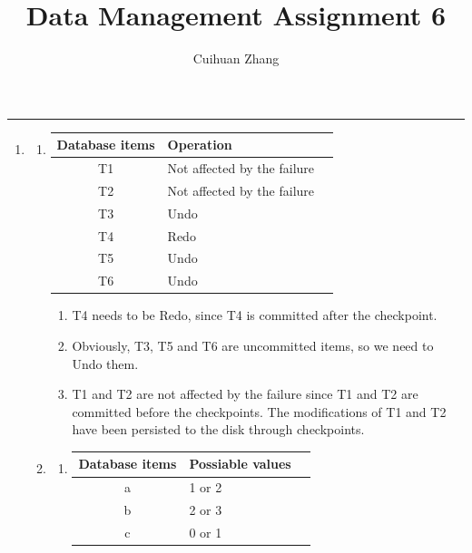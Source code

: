 \documentclass[12pt]{extarticle}
\title{Data Management Assignment 6}
\author{Cuihuan Zhang}
\begin{document}
\maketitle \vspace{-10mm}
\rule{\linewidth}{0.4pt}

\begin{flushleft}
\begin{enumerate}

\item

\begin{enumerate}

\item \begin{tabular}{cll}
\toprule
\textbf{Database items} & \textbf{Operation} \\
\midrule
T1     & Not affected by the failure   \\
T2     & Not affected by the failure    \\
T3     & Undo    \\
T4     & Redo   \\
T5     & Undo   \\
T6     & Undo   \\
\bottomrule
\end{tabular}

\begin{enumerate}

\item T4 needs to be Redo, since T4 is committed after the checkpoint.
\item Obviously, T3, T5 and T6 are uncommitted items, so we need to Undo them.
\item T1 and T2 are not affected by the failure since T1 and T2 are committed before the checkpoints. The modifications of T1 and T2 have been persisted to the disk through checkpoints.
\end{enumerate}

\item

\begin{enumerate}
\item
\begin{tabular}{cll}
\toprule
\textbf{Database items} & \textbf{Possiable values} \\
\midrule
a     & 1 or 2   \\
b     & 2 or 3    \\
c     & 0 or 1    \\
\bottomrule
\end{tabular}


\end{enumerate}
\end{enumerate}
\end{enumerate}
\end{flushleft}
\end{document}
